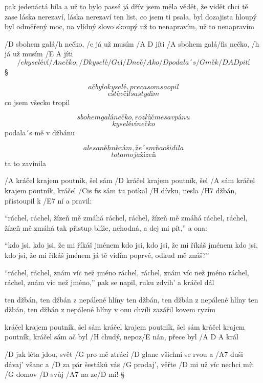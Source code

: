 pak jedenáctá bila a už to bylo passé
já dřív jsem měla vědět, že vidět chci tě zase
láska nerezaví, láska nerezaví
ten list, co jsem ti psala, byl dozajista hloupý
byl odměřený moc, na vlídný slovo skoupý
už to nenapravím, už to nenapravím

\rr




/D sbohem galá/h nečko, /e já už musím /{A D} jíti
/A sbohem galá/fis nečko, /h já už musím /{E A} jíti
\[ /e kyselé ví/A nečko, /D kyselé /G ví/D neč/A ko
/D podala´s /G mě k /{D A D} pití \]\S

\[ ač bylo kyselé, preca som sa opil \]
\[ eště včíl sa stydím \]
co jsem všecko tropil \s

\[ sbohem galánečko, rozlúčme sa v pánu \]
\[ kyselé vínečko \]
podala´s mě v džbánu \s

\[ ale sa něhněvám, že´s mňa ošidila \]
\[ to ta moja žízeň \]
ta to zavinila




/A kráčel krajem poutník, šel sám
/D kráčel krajem poutník, šel /A sám
kráčel krajem poutník, kráčel /{Cis fis} sám
tu potkal /H dívku, nesla /H7 džbán, přistoupil k /E7 ní a pravil: \s

``ráchel, ráchel, žízeň mě zmáhá
ráchel, ráchel, žízeň mě zmáhá
ráchel, ráchel, žízeň mě zmáhá
tak přistup blíže, nehodná, a dej mi pít,'' a ona: \s

``kdo jsi, kdo jsi, že mi říkáš jménem
kdo jsi, kdo jsi, že mi říkáš jménem
kdo jsi, kdo jsi, že mi říkáš jménem
já tě vidím poprvé, odkud mě znáš?'' \s

``ráchel, ráchel, znám víc než jméno
ráchel, ráchel, znám víc než jméno
ráchel, ráchel, znám víc než jméno,''
pak se napil, ruku zdvih' a kráčel dál \s

ten džbán, ten džbán z nepálené hlíny
ten džbán, ten džbán z nepálené hlíny
ten džbán, ten džbán z nepálené hlíny
v onu chvíli zazářil kovem ryzím \s

kráčel krajem poutník, šel sám
kráčel krajem poutník, šel sám
kráčel krajem poutník, kráčel sám
ač byl /H chudý, nepoz/E nán, přece byl /{A D A} král




/D jak léta jdou, svět /G pro mě ztrácí /D glanc
všichni se rvou a /A7 duši dávaj' všanc
a /D za pár šestáků vás /G prodaj', věřte /D mi
už víc nechci mít /G domov /D svůj /A7 na ze/D mi! \S

